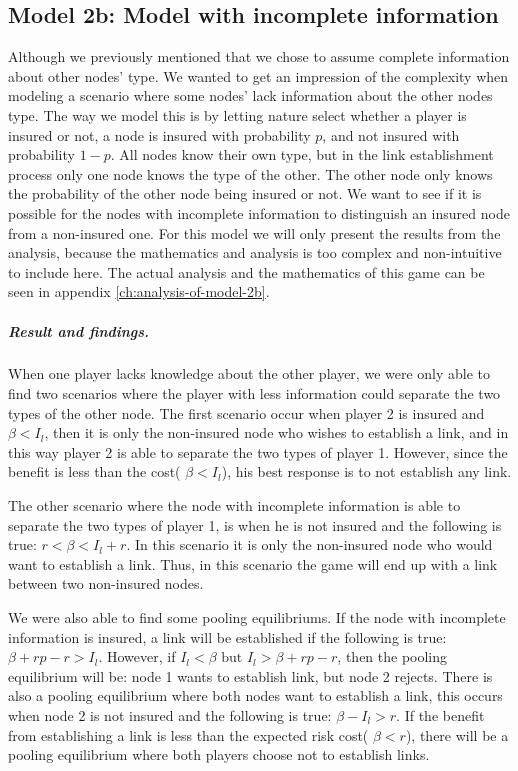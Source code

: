 \subsection{Model 2b: Model with incomplete information}
\label{Model with incomplete information}
Although we previously mentioned that we chose to assume complete information about other nodes' type. We wanted to get an impression of the complexity when modeling a scenario where some nodes' lack information about the other nodes type. The way we model this is by letting nature select whether a player is insured or not, a node is insured with probability $p$, and not insured with probability $1-p$. 
All nodes know their own type, but in the link establishment process only one node knows the type of the other. The other node only knows the probability of the other node being insured or not. 
We want to see if it is possible for the nodes with incomplete information to distinguish an insured node from a non-insured one.
For this model we will only present the results from the analysis, because the mathematics and analysis is too complex and non-intuitive to include here. The actual analysis and the mathematics of this game can be seen in appendix \ref{ch:analysis-of-model-2b}.

\subparagraph{Result and findings.}
When one player lacks knowledge about the other player, we were only able to find two scenarios where the player with less information could separate the two types of the other node. The first scenario occur when player 2 is insured and $\beta<I_{l}$, then it is only the non-insured node who wishes to establish a link, and in this way player 2 is able to separate the two types of player 1. However, since the benefit is less than the cost( $\beta<I_{l}$), his best response is to not establish any link.

The other scenario where the node with incomplete information is able to separate the two types of player 1, is when he is not insured and the following is true: $r<\beta<I_{l}+r$. In this scenario it is only the non-insured node who would want to establish a link. Thus, in this scenario the game will end up with a link between two non-insured nodes.

We were also able to find some pooling equilibriums. If the node with incomplete information is insured, a link will be established if the following is true: $\beta+rp-r>I_{l}$. However, if $I_{l}<\beta \text{ but } I_{l}>\beta+rp-r$, then the pooling equilibrium will be: node 1 wants to establish link, but node 2 rejects.
There is also a pooling equilibrium where both nodes want to establish a link, this occurs when node 2 is not insured and the following is true: $\beta-I_{l}>r$. If the benefit from establishing a link is less than the expected risk cost( $\beta<r$), there will be a pooling equilibrium where both players choose not to establish links. 

